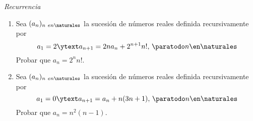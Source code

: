 \separador
\textit{Recurrencia}\par

\begin{enunciado}{\ejercicio}
  \begin{enumerate}[label=\roman*)]
    \item
          Sea $(a_n)_{n\ en \naturales}$ la sucesión de números reales definida recursivamente por
          $$
            a_1 = 2 \ytext a_{n+1} = 2 n a_n+ 2^{n+1}n!,\, \paratodo n \en \naturales
          $$
          Probar que $a_n = 2^n n!$.

    \item
          Sea $(a_n)_{n\ en \naturales}$ la sucesión de números reales definida recursivamente por
          $$
            a_1 = 0 \ytext a_{n+1} = a_n + n(3n + 1),\, \paratodo n \en \naturales
          $$
          Probar que $a_n = n^2 (n-1)$.
  \end{enumerate}
\end{enunciado}

